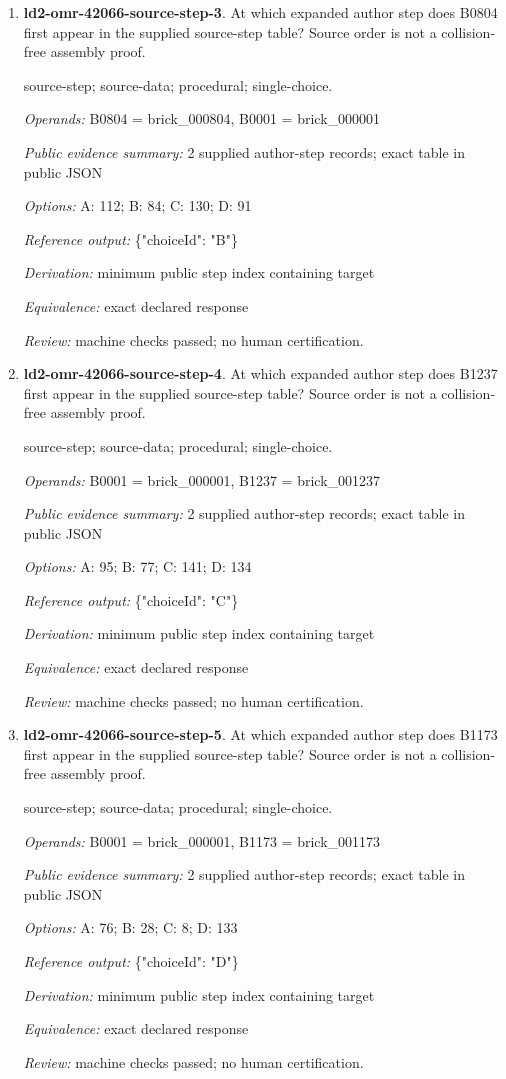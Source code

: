\begin{enumerate}
\item \textbf{ld2-omr-42066-source-step-3}. At which expanded author step does B0804 first appear in the supplied source-step table? Source order is not a collision-free assembly proof.
\par{\small source-step; source-data; procedural; single-choice.\par\textit{Operands:} B0804 = brick\_000804, B0001 = brick\_000001\par\textit{Public evidence summary:} 2 supplied author-step records; exact table in public JSON\par\textit{Options:} A: 112; B: 84; C: 130; D: 91\par\textit{Reference output:} \{"choiceId": "B"\}\par\textit{Derivation:} minimum public step index containing target\par\textit{Equivalence:} exact declared response\par\textit{Review:} machine checks passed; no human certification.}
\item \textbf{ld2-omr-42066-source-step-4}. At which expanded author step does B1237 first appear in the supplied source-step table? Source order is not a collision-free assembly proof.
\par{\small source-step; source-data; procedural; single-choice.\par\textit{Operands:} B0001 = brick\_000001, B1237 = brick\_001237\par\textit{Public evidence summary:} 2 supplied author-step records; exact table in public JSON\par\textit{Options:} A: 95; B: 77; C: 141; D: 134\par\textit{Reference output:} \{"choiceId": "C"\}\par\textit{Derivation:} minimum public step index containing target\par\textit{Equivalence:} exact declared response\par\textit{Review:} machine checks passed; no human certification.}
\item \textbf{ld2-omr-42066-source-step-5}. At which expanded author step does B1173 first appear in the supplied source-step table? Source order is not a collision-free assembly proof.
\par{\small source-step; source-data; procedural; single-choice.\par\textit{Operands:} B0001 = brick\_000001, B1173 = brick\_001173\par\textit{Public evidence summary:} 2 supplied author-step records; exact table in public JSON\par\textit{Options:} A: 76; B: 28; C: 8; D: 133\par\textit{Reference output:} \{"choiceId": "D"\}\par\textit{Derivation:} minimum public step index containing target\par\textit{Equivalence:} exact declared response\par\textit{Review:} machine checks passed; no human certification.}

\end{enumerate}
